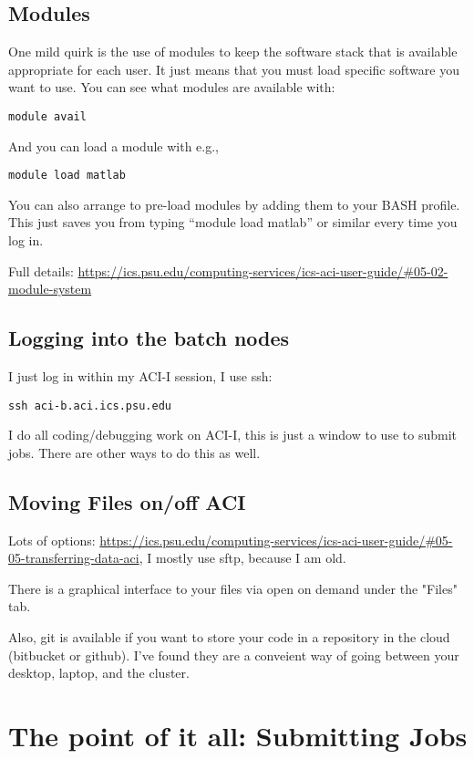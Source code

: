 \documentclass[twoside]{article}
\begin{document}
\subsection{Modules}
 
One mild quirk is the use of modules to keep the software stack that is available appropriate for each user. It just means that you must load specific software you want to use. You can see what modules are available with: 

\noindent
{\tt module avail }

And you can load a module with e.g., 

\noindent
{\tt module load matlab }

You can also arrange to pre-load modules by adding them to your BASH profile. This just saves you from typing ``module load matlab'' or similar every time you log in. 

Full details: \url{https://ics.psu.edu/computing-services/ics-aci-user-guide/#05-02-module-system}

\subsection{Logging into the batch nodes} 

I just log in within my ACI-I session, I use ssh: 

{\tt ssh aci-b.aci.ics.psu.edu }
 
I do all coding/debugging work on ACI-I, this is just a window to use to submit jobs.  There are other ways to do this as well. 

\subsection{Moving Files on/off ACI}

Lots of options: \url{https://ics.psu.edu/computing-services/ics-aci-user-guide/#05-05-transferring-data-aci}, I mostly use sftp, because I am old. 

There is a graphical interface to your files via open on demand under the "Files" tab. 

Also, git is available if you want to store your code in a repository in the cloud (bitbucket or github). I've found they are a conveient way of going between your desktop, laptop, and the cluster. 

\section{The point of it all: Submitting Jobs}
\end{document}
